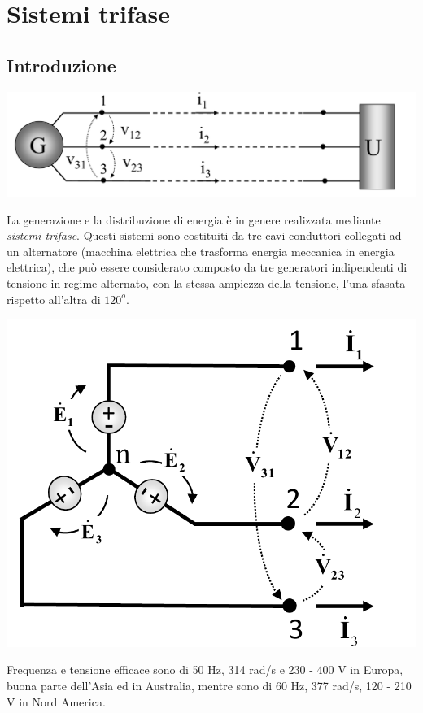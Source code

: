 \documentclass{article}
\begin{document}
\section{Sistemi trifase}
\subsection{Introduzione}
\begin{center}
    \includegraphics[scale=0.27]{Image/Sistemi_trifase_1.png}
\end{center}
La generazione e la distribuzione di energia è in genere realizzata mediante \textit{sistemi trifase}. Questi sistemi sono costituiti da tre cavi conduttori collegati ad un alternatore (macchina elettrica che trasforma energia meccanica in energia elettrica), che può essere considerato composto da tre generatori indipendenti di tensione in regime alternato, con la stessa ampiezza della tensione, l'una sfasata rispetto all'altra di $120^o$.
\begin{center}
    \includegraphics[scale=0.26]{Image/Sistemi_trifase_2.png}
\end{center}
Frequenza e tensione efficace sono di 50 Hz, 314 rad/s e 230 - 400 V in Europa, buona parte dell'Asia ed in Australia, mentre sono di 60 Hz, 377 rad/s, 120 - 210 V in Nord America.
\end{document}
